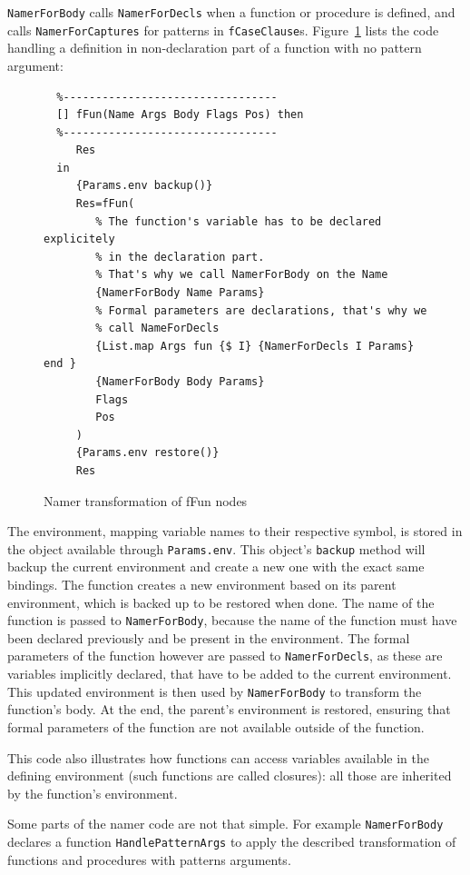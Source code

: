 \documentclass[a4paper]{memoir}
\begin{document}
\lstinline!NamerForBody! calls \lstinline!NamerForDecls! when a function or procedure is
defined, and calls \lstinline!NamerForCaptures! for patterns in \lstinline!fCaseClause!s. 
Figure~\ref{fig:namer:ffun} lists the code handling a definition in non-declaration part of a
function with no pattern argument:

\begin{figure}[h]
\begin{lstlisting}
  %---------------------------------
  [] fFun(Name Args Body Flags Pos) then
  %---------------------------------
     Res
  in
     {Params.env backup()} 
     Res=fFun(
        % The function's variable has to be declared explicitely 
        % in the declaration part.
        % That's why we call NamerForBody on the Name
        {NamerForBody Name Params}
        % Formal parameters are declarations, that's why we 
        % call NameForDecls
        {List.map Args fun {$ I} {NamerForDecls I Params} end }
        {NamerForBody Body Params}
        Flags
        Pos
     )
     {Params.env restore()}
     Res
\end{lstlisting}
\caption{Namer transformation of fFun nodes}
\label{fig:namer:ffun}
\end{figure}


The environment, mapping variable names to their respective symbol, is stored in
the object available through \lstinline!Params.env!. This object's
\lstinline!backup! method will backup the current environment and create a new
one with the exact same bindings.
The function creates a new environment based on its parent environment, which is
backed up to be restored when done. The name of the function is passed to \lstinline!NamerForBody!, because the name of the function must have been declared previously and be present in the environment. 
The formal parameters of the function however are passed to \lstinline!NamerForDecls!, as these are variables implicitly declared, that have to be added to the current environment. This updated environment is then used by \lstinline!NamerForBody! to transform the function's body.
At the end, the parent's environment is restored, ensuring that formal parameters of the function are not available outside of the function.

This code also illustrates how functions can access variables
available in the defining environment (such functions are called closures): all
those are inherited by the function's environment.

Some parts of the namer code are not that simple. For example \lstinline!NamerForBody! 
declares a function \lstinline!HandlePatternArgs!
to apply the described transformation of functions and procedures with patterns
arguments. 
\end{document}
